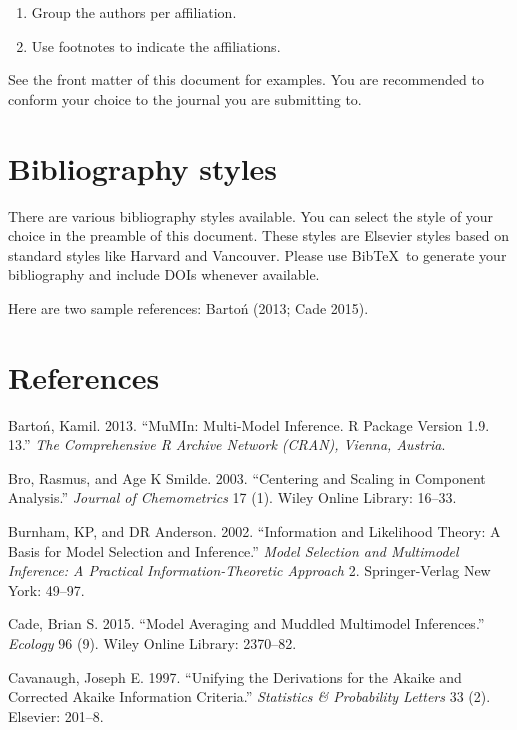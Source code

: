 \documentclass[]{elsarticle} %
\begin{document}
\begin{enumerate}
\def\labelenumi{(\arabic{enumi})}
\item
  Group the authors per affiliation.
\item
  Use footnotes to indicate the affiliations.
\end{enumerate}

See the front matter of this document for examples. You are recommended
to conform your choice to the journal you are submitting to.

\section{Bibliography styles}\label{bibliography-styles}

There are various bibliography styles available. You can select the
style of your choice in the preamble of this document. These styles are
Elsevier styles based on standard styles like Harvard and Vancouver.
Please use BibTeX~to generate your bibliography and include DOIs
whenever available.

Here are two sample references: Bartoń (2013; Cade 2015).

\section*{References}\label{references}

\hypertarget{refs}{}
\hypertarget{ref-barton2013mumin}{}
Bartoń, Kamil. 2013. ``MuMIn: Multi-Model Inference. R Package Version
1.9. 13.'' \emph{The Comprehensive R Archive Network (CRAN), Vienna,
Austria}.

\hypertarget{ref-bro2003centering}{}
Bro, Rasmus, and Age K Smilde. 2003. ``Centering and Scaling in
Component Analysis.'' \emph{Journal of Chemometrics} 17 (1). Wiley
Online Library: 16--33.

\hypertarget{ref-burnham2002information}{}
Burnham, KP, and DR Anderson. 2002. ``Information and Likelihood Theory:
A Basis for Model Selection and Inference.'' \emph{Model Selection and
Multimodel Inference: A Practical Information-Theoretic Approach} 2.
Springer-Verlag New York: 49--97.

\hypertarget{ref-cade2015model}{}
Cade, Brian S. 2015. ``Model Averaging and Muddled Multimodel
Inferences.'' \emph{Ecology} 96 (9). Wiley Online Library: 2370--82.

\hypertarget{ref-cavanaugh1997unifying}{}
Cavanaugh, Joseph E. 1997. ``Unifying the Derivations for the Akaike and
Corrected Akaike Information Criteria.'' \emph{Statistics \& Probability
Letters} 33 (2). Elsevier: 201--8.
\end{document}
